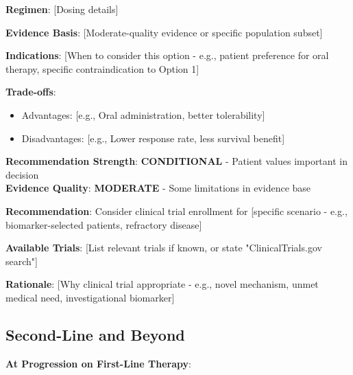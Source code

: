\documentclass[10pt,letterpaper]{article}
\begin{document}
\vspace{3pt}

\begin{tcolorbox}[enhanced,colback=conditionalyellow!10,colframe=conditionalyellow,
title={\textbf{Option 2: [Alternative Regimen]} \hfill \colorbox{white}{\textbf{CONDITIONAL (2B)}}},
fonttitle=\bfseries\small,coltitle=black]
{\small
\textbf{Regimen}: [Dosing details]

\textbf{Evidence Basis}: [Moderate-quality evidence or specific population subset]

\textbf{Indications}: [When to consider this option - e.g., patient preference for oral therapy, specific contraindication to Option 1]

\textbf{Trade-offs}:
\begin{itemize}
\item Advantages: [e.g., Oral administration, better tolerability]
\item Disadvantages: [e.g., Lower response rate, less survival benefit]
\end{itemize}

\textbf{Recommendation Strength}: \textbf{CONDITIONAL} - Patient values important in decision\\
\textbf{Evidence Quality}: \textbf{MODERATE} - Some limitations in evidence base
}
\end{tcolorbox}

\vspace{3pt}

\begin{tcolorbox}[enhanced,colback=researchblue!10,colframe=researchblue,
title={\textbf{Option 3: Clinical Trial} \hfill \colorbox{white}{\textbf{RESEARCH (R)}}},
fonttitle=\bfseries\small,coltitle=black]
{\small
\textbf{Recommendation}: Consider clinical trial enrollment for [specific scenario - e.g., biomarker-selected patients, refractory disease]

\textbf{Available Trials}: [List relevant trials if known, or state "ClinicalTrials.gov search"]

\textbf{Rationale}: [Why clinical trial appropriate - e.g., novel mechanism, unmet medical need, investigational biomarker]
}
\end{tcolorbox}

\subsection{Second-Line and Beyond}

\textbf{At Progression on First-Line Therapy}:
\end{document}
